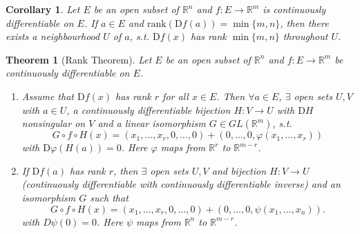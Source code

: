 \documentclass[12pt]{article}
\theoremstyle{plain}
\newtheorem{thm}{Theorem}
\newtheorem*{corollary}{Corollary}
\theoremstyle{definition}
\begin{document}
\begin{corollary}
    Let $E$ be an open subset of $\mathbb{R}^n$ and $f:E\rightarrow \mathbb{R}^m$ is continuously differentiable on $E$.
    If $a\in E$ and $\text{rank}(\mathrm{D}f(a)) = \min\{m,n\}$, then there exists a neighbourhood $U$ of $a$, s.t.
    $\mathrm{D}f(x)$ has rank $\min\{m,n\}$ throughout $U$.
\end{corollary}

\begin{thm}[Rank Theorem]
    Let $E$ be an open subset of $\mathbb{R}^n$ and $f:E\rightarrow\mathbb{R}^m$ be continuously differentiable on $E$.
    \begin{enumerate}
        \item
        Assume that $\mathrm{D}f(x)$ has rank $r$ for all $x\in E$.
        Then $\forall a\in E$, $\exists$ open sets $U, V$ with $a\in U$, a continuously differentiable bijection $H:V\rightarrow U$ with $\mathrm{D}H$
        nonsingular on $V$ and a linear isomorphism $G\in GL(\mathbb{R}^m)$, s.t.
        \[
            G\circ f\circ H(x) = (x_1,\ldots,x_r,0,\ldots,0)
            +(0,\ldots,0,\varphi(x_1,\ldots,x_r))
        \]
        with $\mathrm{D}\varphi(H(a)) = 0$.
        Here $\varphi$ maps from $\mathbb{R}^{r}$ to $\mathbb{R}^{m-r}$.

        \item
            If $\mathrm{D}f(a)$ has rank $r$, then $\exists$ open sets $U, V$ and bijection $H:V\rightarrow U$ (continuously differentiable with
            continuously differentiable inverse) and an isomorphism $G$ such that
            \[
                G\circ f\circ H(x) = (x_1,\ldots,x_r,0,\ldots,0) + (0,\ldots,0,\psi(x_1,\ldots,x_n)).
            \]
            with $D\psi(0) = 0$.
            Here $\psi$ maps from $\mathbb{R}^{n}$ to $\mathbb{R}^{m-r}$.
    \end{enumerate}
\end{thm}
\end{document}
